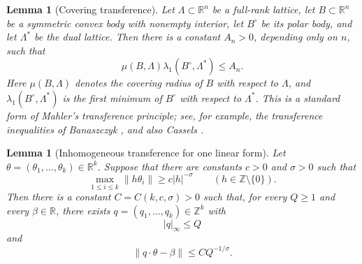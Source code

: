 \documentclass[11pt]{article}
\newtheorem{lemma}[theorem]{Lemma}
\theoremstyle{remark}
\newcommand{\R}{\mathbb R}
\newcommand{\Z}{\mathbb Z}
\begin{document}
\begin{lemma}[Covering transference]\label{lem:covering-transference}
Let $\Lambda\subset\R^n$ be a full-rank lattice, let $B\subset\R^n$ be a symmetric convex body with nonempty interior, let $B^\circ$ be its polar body, and let $\Lambda^*$ be the dual lattice. Then there is a constant $A_n>0$, depending only on $n$, such that
\[
  \mu(B,\Lambda)\lambda_1(B^\circ,\Lambda^*)\leq A_n.
  \tag{3.1}\label{eq:mahler}
\]
Here $\mu(B,\Lambda)$ denotes the covering radius of $B$ with respect to $\Lambda$, and $\lambda_1(B^\circ,\Lambda^*)$ is the first minimum of $B^\circ$ with respect to $\Lambda^*$. This is a standard form of Mahler's transference principle; see, for example, the transference inequalities of Banaszczyk \cite{Banaszczyk1993}, and also Cassels \cite[Chapter VIII]{Cassels1959}.
\end{lemma}

\begin{lemma}[Inhomogeneous transference for one linear form]\label{lem:transference}
Let $\theta=(\theta_1,\ldots,\theta_k)\in\R^k$. Suppose that there are constants $c>0$ and $\sigma>0$ such that
\[
  \max_{1\leq i\leq k}\|h\theta_i\|
  \geq c |h|^{-\sigma}
  \qquad(h\in\Z\setminus\{0\}).
  \tag{3.2}\label{eq:dual-assumption}
\]
Then there is a constant $C=C(k,c,\sigma)>0$ such that, for every $Q\geq 1$ and every $\beta\in\R$, there exists $q=(q_1,\ldots,q_k)\in\Z^k$ with
\[
  |q|_\infty\leq Q
\]
and
\[
  \|q\cdot\theta-\beta\|\leq C Q^{-1/\sigma}.
\]
\end{lemma}
\end{document}
